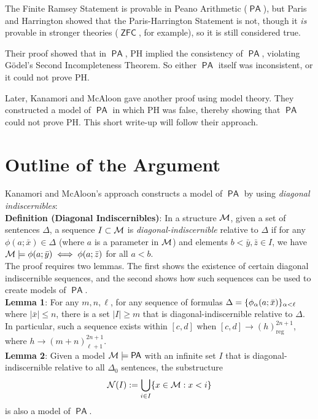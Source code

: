 \documentclass{amsart}
\DeclareMathOperator{\PA}{\mathsf{PA}}
\DeclareMathOperator{\ZFC}{\mathsf{ZFC}}
\begin{document}
	The Finite Ramsey Statement is provable in Peano Arithmetic ($\PA$), but Paris and Harrington showed that the Paris-Harrington Statement is not, though it \textit{is} provable in stronger theories ($\ZFC$, for example), so it is still considered true. 
	
	Their proof showed that in $\PA$, PH implied the consistency of $\PA$, violating G\"odel's Second Incompleteness Theorem. So either $\PA$ itself was inconsistent, or it could not prove PH. 
	
	Later, Kanamori and McAloon gave another proof using model theory. They constructed a model of $\PA$ in which PH was false, thereby showing that $\PA$ could not prove PH. This short write-up will follow their approach.
	
	\newpage 
	
	\section{Outline of the Argument}
	
	Kanamori and McAloon's approach constructs a model of $\PA$ by using \textit{diagonal indiscernibles}:\\
	
	\noindent \textbf{Definition (Diagonal Indiscernibles)}: In a structure $\mathcal{M}$, given a set of sentences $\Delta$, a sequence $I\subset \mathcal{M}$ is \textit{diagonal-indiscernible} relative to $\Delta$ if for any $\phi(a;\bar{x})\in \Delta$ (where $a$ is a parameter in $\mathcal{M}$) and elements $b<\bar{y},\bar{z}\in I$, we have $\mathcal{M}\models \phi(a;\bar{y}) \iff \phi(a;\bar{z})$ for all $a<b$.\\
	
	The proof requires two lemmas. The first shows the existence of certain diagonal indiscernible sequences, and the second shows how such sequences can be used to create models of $\PA$.\\
	
	\noindent \textbf{Lemma 1}: For any $m,n,\ell$, for any sequence of formulas $\Delta=\{\phi_{\alpha}(a;\bar{x})\}_{\alpha<\ell}$ where $|\bar{x}|\leq n$, there is a set $|I|\geq m$ that is diagonal-indiscernible relative to $\Delta$. In particular, such a sequence exists within $[c,d]$ when $[c,d]\to (h)_{\text{reg}}^{2n+1}$, where $h\to (m+n)^{2n+1}_{\ell+1}$.\\
	
	\noindent \textbf{Lemma 2}: Given a model $\M\models \PA$ with an infinite set $I$ that is diagonal-indiscernible relative to all $\Delta_0$ sentences, the substructure
	$$
	\mathcal{N}(I) := \bigcup_{i\in I} \{x\in \mathcal{M} : x<i\}
	$$
	is also a model of $\PA$.\\
	
\end{document}
